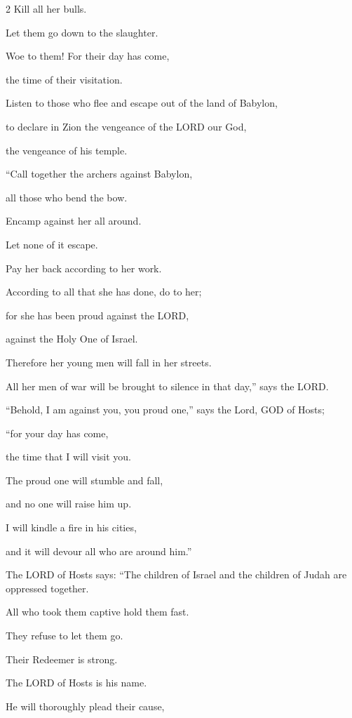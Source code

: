 \begin{multicols}{2}
\myverse{}Kill all her bulls.

Let them go down to the slaughter.

Woe to them! For their day has come,

the time of their visitation.


\myverse{}Listen to those who flee and escape out of the land of Babylon,

to declare in Zion the vengeance of the LORD our God,

the vengeance of his temple.

\vspace{\baselineskip}

\myverse{}“Call together the archers against Babylon,

all those who bend the bow.

Encamp against her all around.

Let none of it escape.

Pay her back according to her work.

According to all that she has done, do to her;

for she has been proud against the LORD,

against the Holy One of Israel.


\myverse{}Therefore her young men will fall in her streets.

All her men of war will be brought to silence in that day,” says the LORD.


\myverse{}“Behold, I am against you, you proud one,” says the Lord, GOD
of Hosts;

“for your day has come,

the time that I will visit you.


\myverse{}The proud one will stumble and fall,

and no one will raise him up.

I will kindle a fire in his cities,

and it will devour all who are around him.”


\myverse{}The LORD of Hosts says: “The children of Israel and the children
of Judah are oppressed together.

All who took them captive hold them fast.

They refuse to let them go.


\myverse{}Their Redeemer is strong.

The LORD of Hosts is his name.

He will thoroughly plead their cause,


\end{multicols}
